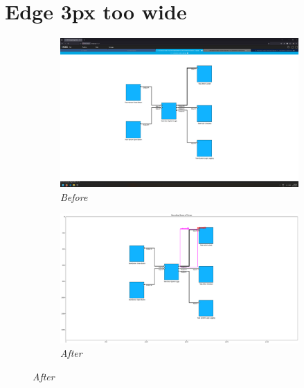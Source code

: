 \documentclass{article}
\begin{document}
\section{Edge 3px too wide}
\begin{figure}[H]
    \centering
    \begin{subfigure}[t]{0.9\textwidth}
        \centering
        \includegraphics[width=\textwidth]{testcases/edge_3px_too_wide/144613-921105_input_image.png}
        \caption*{\textit{Before}}
    \end{subfigure}
    \newline    
    \begin{subfigure}[t]{0.9\textwidth}
        \centering
        \includegraphics[width=\textwidth]{testcases/edge_3px_too_wide/144634-044834_element_bbox_errors_labeled_colored.png}
        \caption*{\textit{After}}
    \end{subfigure}
    \label{fig:edge_too_wide_3}
\end{figure}
\newpage
\end{document}
